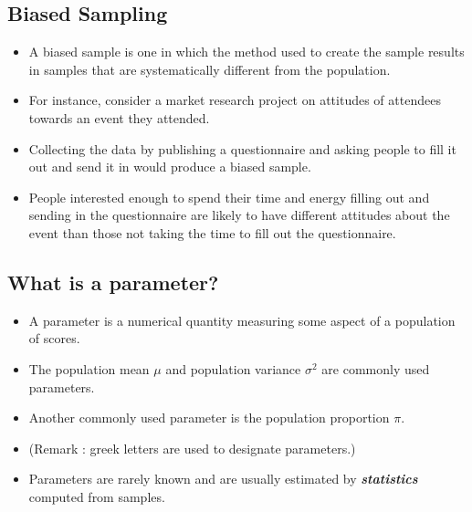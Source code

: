 \documentclass[a4paper,12pt]{article}
\begin{document}
\subsection*{Biased Sampling}
\begin{itemize}
	
	
	\item A biased sample is one in which the method used to create the sample results
	in samples that are systematically different from the population.
	
	
	\item For instance, consider a market research project on attitudes of attendees towards an event they attended.
	
	\item Collecting the data by publishing a questionnaire and asking people to fill it out and
	send it in would produce a biased sample.
	
	\item People interested enough to spend their time and energy filling out and sending in the questionnaire
	are likely to have different attitudes about the event than those not taking the time to fill out the questionnaire.
	
\end{itemize}






\subsection*{What is a parameter?}
\begin{itemize}
	\item A parameter is a numerical quantity measuring some aspect of a population of scores.
	\item The population mean $\mu$ and population variance $\sigma^2$ are commonly used parameters.
	\item Another commonly used parameter is the population proportion $\pi$.
	\item (Remark : greek letters are used to designate parameters.)
	\item Parameters are rarely known and are usually estimated by \textbf{\emph{statistics}} computed from samples.
\end{itemize}


\end{document}
